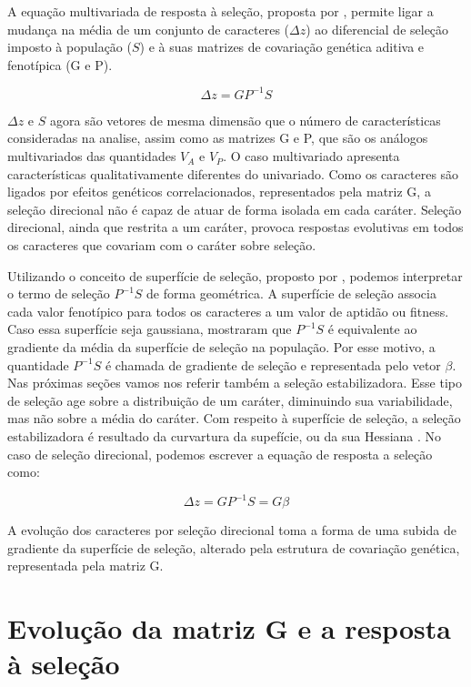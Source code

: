 A equação multivariada de resposta à seleção,
proposta por \cite{Lande1979}, permite ligar a mudança na média de um
conjunto de caracteres ($\Delta z$) ao diferencial de seleção imposto à população
($S$) e à suas matrizes de covariação genética aditiva e fenotípica (G e P). 

\begin{equation}
    \Delta z = GP^{-1}S
\end{equation}
 
$\Delta z$ e $S$ agora são vetores de mesma dimensão que o número
de características consideradas na analise, assim como as matrizes G e
P, que são os análogos multivariados das quantidades $V_A$ e $V_P$.
O caso multivariado apresenta características qualitativamente
diferentes do univariado.
Como os caracteres são ligados por efeitos genéticos correlacionados,
representados pela matriz G, a seleção direcional não é capaz de atuar de
forma isolada em cada caráter.
Seleção direcional, ainda que restrita a um caráter, provoca respostas
evolutivas em todos os caracteres que covariam com o caráter sobre
seleção.

Utilizando o conceito de superfície de seleção, proposto por
\cite{Wright1932}, podemos interpretar o termo de seleção $P^{-1}S$ de
forma geométrica. 
A superfície de seleção associa cada valor fenotípico para todos os
caracteres a um valor de aptidão ou fitness.
Caso essa superfície seja gaussiana, \cite{Lande1983} mostraram que 
$P^{-1}S$ é equivalente ao gradiente da média da superfície de seleção
na população. Por esse motivo, a quantidade  $P^{-1}S$ é chamada
de gradiente de seleção e representada pelo vetor $\beta$. 
Nas próximas seções vamos nos referir também a seleção estabilizadora.
Esse tipo de seleção age sobre a distribuição de um caráter, diminuindo
sua variabilidade, mas não sobre a média do caráter.
Com respeito à superfície de seleção, a seleção estabilizadora é
resultado da curvartura da supefície, ou da sua Hessiana
\citep{Lande1983}.
No caso de seleção direcional, podemos escrever a equação de resposta a seleção como:

\begin{equation}
    \Delta z = GP^{-1}S = G\beta
\end{equation}

A evolução dos caracteres por seleção direcional toma a forma de uma
subida de gradiente da superfície de seleção, alterado pela estrutura de
covariação genética, representada pela matriz G.

\section{Evolução da matriz G e a resposta à seleção}\label{intro:matG}


